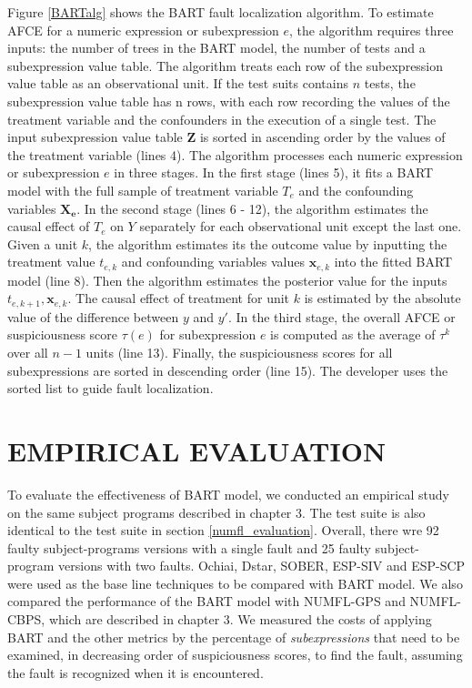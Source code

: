 Figure \ref{BARTalg} shows the BART fault localization algorithm.  To estimate AFCE for a numeric expression or subexpression $e$, the algorithm requires three inputs: the number of trees in the BART model, the number of tests and a subexpression value table. The algorithm treats each row of the subexpression value table as an observational unit. If the test suits contains $n$ tests, the subexpression value table has n rows, with each row recording the values of the treatment variable and the confounders in the execution of a single test. The input subexpression value table $\pmb{Z}$ is sorted in ascending order by the values of the treatment variable (lines 4).  The algorithm processes each numeric expression or subexpression $e$ in three stages.  In the first stage (lines 5), it fits a BART model with the full sample of treatment variable $T_e$ and the confounding variables $\pmb {X_e}$.  In the second stage (lines 6 - 12), the algorithm estimates the causal effect of $T_e$ on $Y$ separately for each observational unit except the last one.  Given a unit $k$, the algorithm estimates its the outcome value by inputting the treatment value $t_{e,k}$ and confounding variables values ${\pmb{x}_{e,k}}$ into the fitted BART model (line 8). Then the algorithm estimates the posterior value for the inputs $t_{e,k+1},{\pmb{x}_{e,k}}$. The causal effect of treatment for unit $k$ is estimated by the absolute value of the difference between $y$ and $y'$.  In the third stage, the overall AFCE or suspiciousness score $\tau(e)$ for subexpression $e$ is computed as the average of $\tau^k$ over all $n-1$ units (line 13).  Finally, the suspiciousness scores for all subexpressions are sorted in descending order (line 15).  The developer uses the sorted list to guide fault localization.


\section{EMPIRICAL EVALUATION}\label{BARTevaluation}%

To evaluate the effectiveness of BART model, we conducted an empirical study on the same subject programs described in chapter 3.  The test suite is also identical to the test suite in section \ref{numfl_evaluation}.  Overall, there wre 92 faulty subject-programs versions with a single fault and 25 faulty subject-program versions with two faults. Ochiai, Dstar, SOBER, ESP-SIV and ESP-SCP were used as the base line techniques to be compared with BART model. We also compared the performance of the BART model with NUMFL-GPS and NUMFL-CBPS, which are described in chapter 3. We measured the costs of applying BART and the other metrics by the percentage of {\it subexpressions} that need to be examined, in decreasing order of suspiciousness scores, to find the fault, assuming the fault is recognized when it is encountered.

